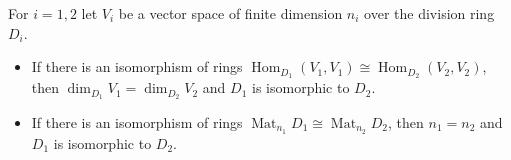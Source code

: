 For $i = 1,2$ let $V_i$ be a vector space of finite dimension $n_i$ over the division ring $D_i$.
\begin{itemize}
\item[(i)] If there is an isomorphism of rings $\operatorname{Hom}_{D_1}(V_1,V_1) \cong \operatorname{Hom}_{D_2}(V_2,V_2)$, then $\dim_{D_1}V_1 = \dim_{D_2}V_2$ and $D_1$ is isomorphic to $D_2$.
\item[(ii)] If there is an isomorphism of rings $\operatorname{Mat}_{n_1}D_1 \cong \operatorname{Mat}_{n_2}D_2$, then $n_1 = n_2$ and $D_1$ is isomorphic to $D_2$.
\end{itemize}
